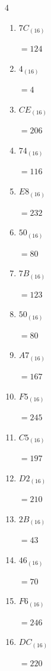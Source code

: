 \begin{multicols}{4}
\begin{enumerate}
        $=124$

  \item $7C_{(16)}$

        $=124$

  \item $4_{(16)}$

        $=4$

  \item $CE_{(16)}$

        $=206$

  \item $74_{(16)}$

        $=116$

  \item $E8_{(16)}$

        $=232$

  \item $50_{(16)}$

        $=80$

  \item $7B_{(16)}$

        $=123$

  \item $50_{(16)}$

        $=80$

  \item $A7_{(16)}$

        $=167$

  \item $F5_{(16)}$

        $=245$

\columnbreak %

  \item $C5_{(16)}$

        $=197$

  \item $D2_{(16)}$

        $=210$

  \item $2B_{(16)}$

        $=43$

  \item $46_{(16)}$

        $=70$

  \item $F6_{(16)}$

        $=246$

  \item $DC_{(16)}$

        $=220$


\end{enumerate}
\end{multicols}
